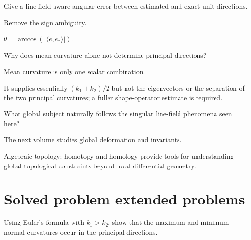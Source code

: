 \begin{exercise}\label{exr:vii42-22}
Give a line-field-aware angular error between estimated and exact unit directions.
\end{exercise}

\begin{hint}
Remove the sign ambiguity.
\end{hint}

\begin{solution}
\(\theta=\arccos(|\langle e,e_*\rangle|)\).
\end{solution}

\begin{exercise}\label{exr:vii42-23}
Why does mean curvature alone not determine principal directions?
\end{exercise}

\begin{hint}
Mean curvature is only one scalar combination.
\end{hint}

\begin{solution}
It supplies essentially \((k_1+k_2)/2\) but not the eigenvectors or the separation of the two principal curvatures; a fuller shape-operator estimate is required.
\end{solution}

\begin{exercise}\label{exr:vii42-24}
What global subject naturally follows the singular line-field phenomena seen here?
\end{exercise}

\begin{hint}
The next volume studies global deformation and invariants.
\end{hint}

\begin{solution}
Algebraic topology: homotopy and homology provide tools for understanding global topological constraints beyond local differential geometry.
\end{solution}


\section{Solved problem extended problems}

\begin{problem}\label{prob:vii42-01}
Using Euler's formula with \(k_1>k_2\), show that the maximum and minimum normal curvatures occur in the principal directions.
\end{problem}

